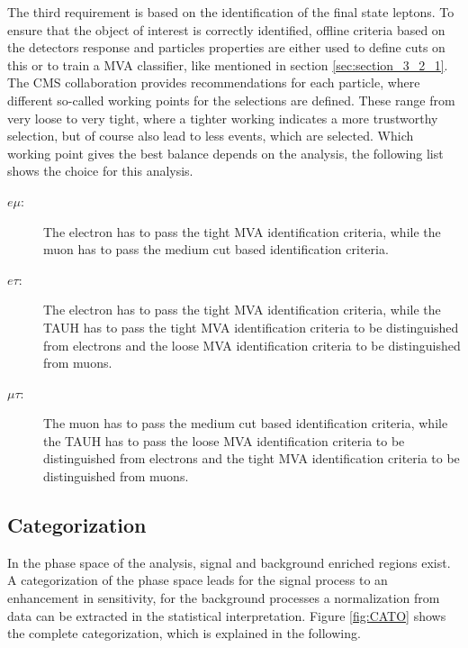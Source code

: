 The third requirement is based on the identification of the final state leptons. To ensure that the object of interest is correctly identified, offline criteria based on the detectors response and particles properties are either used to define cuts on this or to train a \gls{MVA} classifier, like mentioned in section \ref{sec:section_3_2_1}. The \gls{CMS} collaboration provides recommendations for each particle, where different so-called working points for the selections are defined. These range from very loose to very tight, where a tighter working indicates a more trustworthy selection, but of course also lead to less events, which are selected. Which working point gives the best balance depends on the analysis, the following list shows the choice for this analysis. 

\begin{description}
	\item [$e\mu$:] The electron has to pass the tight \gls{MVA} identification criteria, while the muon has to pass the medium cut based identification criteria. 
	\item [$e\tau$:]  The electron has to pass the tight \gls{MVA} identification criteria, while the \gls{TAUH} has to pass the tight \gls{MVA} identification criteria to be distinguished from electrons and the loose \gls{MVA} identification criteria to be distinguished from muons.
	\item [$\mu\tau$:]  The muon has to pass the medium cut based identification criteria, while the \gls{TAUH} has to pass the loose \gls{MVA} identification criteria to be distinguished from electrons and the tight \gls{MVA} identification criteria to be distinguished from muons.
\end{description}


\subsection{Categorization}
\label{sec:section_3_2_3}

In the phase space of the analysis, signal and background enriched regions exist. A categorization of the phase space leads for the signal process to an enhancement in sensitivity, for the background processes a normalization from data can be extracted in the statistical interpretation. Figure \ref{fig:CATO} shows the complete categorization, which is explained in the following. \\


